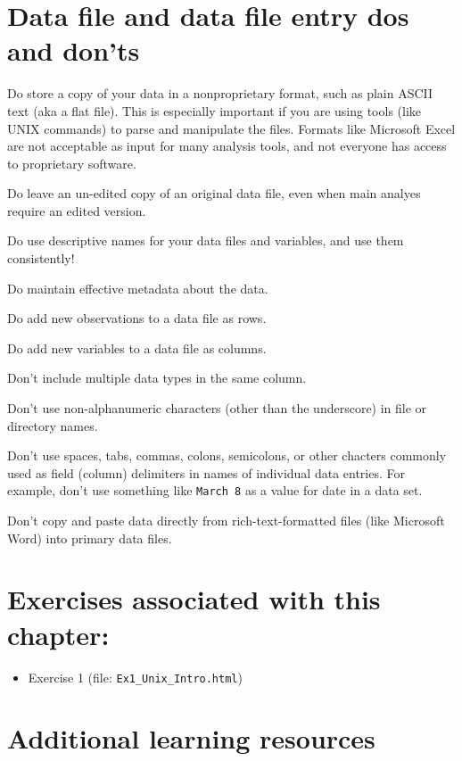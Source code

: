 \documentclass[]{book}
\providecommand{\tightlist}{%
  \setlength{\itemsep}{0pt}\setlength{\parskip}{0pt}}
\begin{document}
\hypertarget{data-file-and-data-file-entry-dos-and-donts}{%
\section{Data file and data file entry dos and don'ts}\label{data-file-and-data-file-entry-dos-and-donts}}

Do store a copy of your data in a nonproprietary format, such as plain ASCII text (aka a flat file). This is especially important if you are using tools (like UNIX commands) to parse and manipulate the files. Formats like Microsoft Excel are not acceptable as input for many analysis tools, and not everyone has access to proprietary software.

Do leave an un-edited copy of an original data file, even when main analyes require an edited version.

Do use descriptive names for your data files and variables, and use them consistently!

Do maintain effective metadata about the data.

Do add new observations to a data file as rows.

Do add new variables to a data file as columns.

Don't include multiple data types in the same column.

Don't use non-alphanumeric characters (other than the underscore) in file or directory names.

Don't use spaces, tabs, commas, colons, semicolons, or other chacters commonly used as field (column) delimiters in names of individual data entries. For example, don't use something like \texttt{March\ 8} as a value for date in a data set.

Don't copy and paste data directly from rich-text-formatted files (like Microsoft Word) into primary data files.

\hypertarget{exercises-associated-with-this-chapter}{%
\section{Exercises associated with this chapter:}\label{exercises-associated-with-this-chapter}}

\begin{itemize}
\tightlist
\item
  Exercise 1 (file: \texttt{Ex1\_Unix\_Intro.html})
\end{itemize}

\hypertarget{additional-learning-resources}{%
\section{Additional learning resources}\label{additional-learning-resources}}
\end{document}

